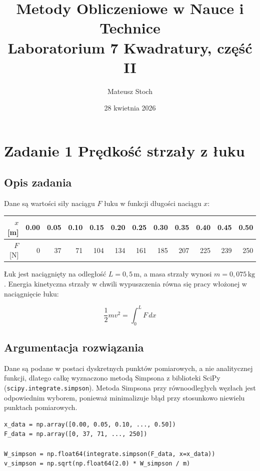 \documentclass[12pt, a4paper]{article}
\title{
  \textbf{Metody Obliczeniowe w Nauce i Technice} \\[0.5em]
  \large Laboratorium 7 \textendash{} Kwadratury, część II
}
\author{Mateusz Stoch}
\date{28 kwietnia 2026}
\begin{document}
\maketitle

\section{Zadanie 1 \textendash{} Prędkość strzały z łuku}

\subsection{Opis zadania}

Dane są wartości siły naciągu $F$ łuku w funkcji długości naciągu $x$:

\begin{center}
\begin{tabular}{r|rrrrrrrrrrr}
\toprule
$x$ [m] & 0.00 & 0.05 & 0.10 & 0.15 & 0.20 & 0.25 & 0.30 & 0.35 & 0.40 & 0.45 & 0.50 \\
\midrule
$F$ [N]  & 0    & 37   & 71   & 104  & 134  & 161  & 185  & 207  & 225  & 239  & 250  \\
\bottomrule
\end{tabular}
\end{center}

Łuk jest naciągnięty na odległość $L = 0{,}5\,\text{m}$, a masa strzały wynosi $m = 0{,}075\,\text{kg}$. Energia kinetyczna strzały w chwili wypuszczenia równa się pracy włożonej w naciągnięcie łuku:

\[
  \frac{1}{2}mv^2 = \int_0^L F\,dx
\]

\subsection{Argumentacja rozwiązania}

Dane są podane w postaci dyskretnych punktów pomiarowych, a nie analitycznej funkcji, dlatego całkę wyznaczono metodą Simpsona z biblioteki SciPy (\texttt{scipy.integrate.simpson}). Metoda Simpsona przy równoodległych węzłach jest odpowiednim wyborem, ponieważ minimalizuje błąd przy stosunkowo niewielu punktach pomiarowych.

\begin{lstlisting}[caption={Obliczenie pracy i prędkości strzały}]
x_data = np.array([0.00, 0.05, 0.10, ..., 0.50])
F_data = np.array([0, 37, 71, ..., 250])

W_simpson = np.float64(integrate.simpson(F_data, x=x_data))
v_simpson = np.sqrt(np.float64(2.0) * W_simpson / m)
\end{lstlisting}
\end{document}
